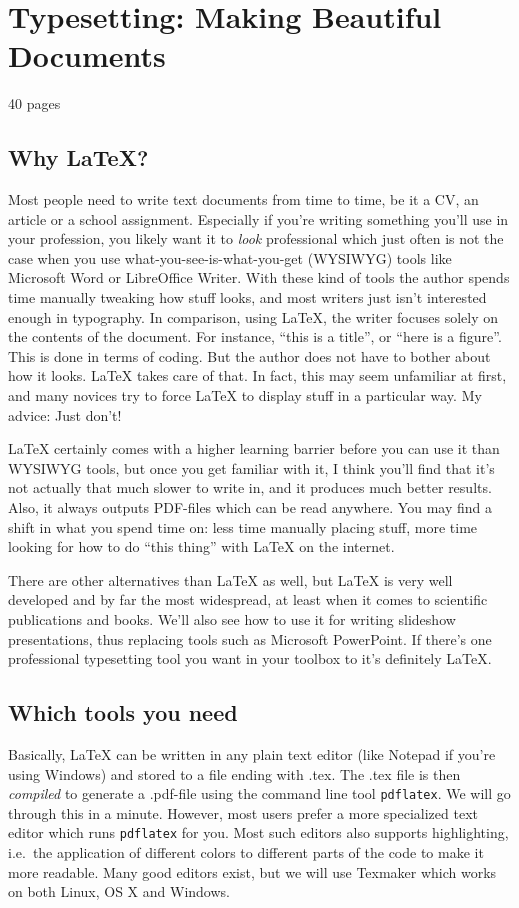\chapter{Typesetting: Making Beautiful Documents}
40 pages

\section{Why \LaTeX?}
Most people need to write text documents from time to time, be it a CV, an article or a school assignment. Especially if you're writing something you'll use in your profession, you likely want it to \emph{look} professional which just often is not the case when you use what-you-see-is-what-you-get (WYSIWYG) tools like Microsoft Word or LibreOffice Writer. With these kind of tools the author spends time manually tweaking how stuff looks, and most writers just isn't interested enough in typography. In comparison, using \LaTeX{}, the writer focuses solely on the contents of the document. For instance, ``this is a title'', or ``here is a figure''. This is done in terms of coding. But the author does not have to bother about how it looks. \LaTeX{} takes care of that. In fact, this may seem unfamiliar at first, and many novices try to force \LaTeX{} to display stuff in a particular way. My advice: Just don't!

\LaTeX{} certainly comes with a higher learning barrier before you can use it than WYSIWYG tools, but once you get familiar with it, I think you'll find that it's not actually that much slower to write in, and it produces much better results. Also, it always outputs PDF-files which can be read anywhere. You may find a shift in what you spend time on: less time manually placing stuff, more time looking for how to do ``this thing'' with \LaTeX{} on the internet.

There are other alternatives than \LaTeX{} as well, but \LaTeX{} is very well developed and by far the most widespread, at least when it comes to scientific publications and books. We'll also see how to use it for writing slideshow presentations, thus replacing tools such as Microsoft PowerPoint. If there's one professional typesetting tool you want in your toolbox to it's definitely \LaTeX{}.

\section{Which tools you need}
Basically, \LaTeX{} can be written in any plain text editor (like Notepad if you're using Windows) and stored to a file ending with .tex. The .tex file is then \emph{compiled} to generate a .pdf-file using the command line tool \texttt{pdflatex}. We will go through this in a minute. However, most users prefer a more specialized text editor which runs \texttt{pdflatex} for you. Most such editors also supports highlighting, i.e.\ the application of different colors to different parts of the code to make it more readable. Many good editors exist, but we will use Texmaker which works on both Linux, OS X and Windows.

